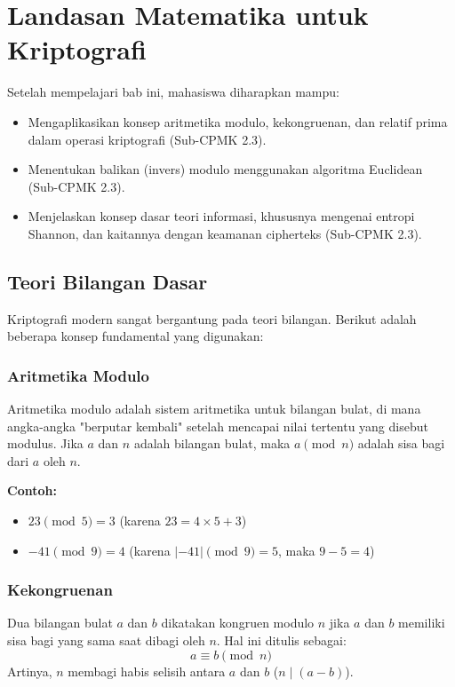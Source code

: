 \documentclass[../main.tex]{subfiles}
\begin{document}
\chapter{Landasan Matematika untuk Kriptografi}

\begin{learningoutcome}
Setelah mempelajari bab ini, mahasiswa diharapkan mampu:
\begin{itemize}
    \item Mengaplikasikan konsep aritmetika modulo, kekongruenan, dan relatif prima dalam operasi kriptografi (Sub-CPMK 2.3).
    \item Menentukan balikan (invers) modulo menggunakan algoritma Euclidean (Sub-CPMK 2.3).
    \item Menjelaskan konsep dasar teori informasi, khususnya mengenai entropi Shannon, dan kaitannya dengan keamanan cipherteks (Sub-CPMK 2.3).
\end{itemize}
\end{learningoutcome}

\section{Teori Bilangan Dasar}
Kriptografi modern sangat bergantung pada teori bilangan. Berikut adalah beberapa konsep fundamental yang digunakan:

\subsection{Aritmetika Modulo}
Aritmetika modulo adalah sistem aritmetika untuk bilangan bulat, di mana angka-angka "berputar kembali" setelah mencapai nilai tertentu yang disebut modulus.
Jika $a$ dan $n$ adalah bilangan bulat, maka $a \pmod{n}$ adalah sisa bagi dari $a$ oleh $n$.

\textbf{Contoh:}
\begin{itemize}
    \item $23 \pmod{5} = 3$ (karena $23 = 4 \times 5 + 3$)
    \item $-41 \pmod{9} = 4$ (karena $|-41| \pmod{9} = 5$, maka $9 - 5 = 4$)
\end{itemize}

\subsection{Kekongruenan}
Dua bilangan bulat $a$ dan $b$ dikatakan kongruen modulo $n$ jika $a$ dan $b$ memiliki sisa bagi yang sama saat dibagi oleh $n$. Hal ini ditulis sebagai:
\[ a \equiv b \pmod{n} \]
Artinya, $n$ membagi habis selisih antara $a$ dan $b$ ($n \mid (a - b)$).
\end{document}
